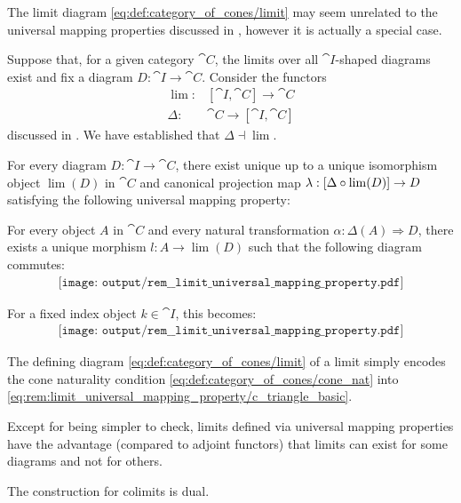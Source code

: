 \begin{remark}\label{rem:limit_universal_mapping_property}
  The limit diagram \eqref{eq:def:category_of_cones/limit} may seem unrelated to the universal mapping properties discussed in , however it is actually a special case.

  Suppose that, for a given category \( \cat{C} \), the limits over all \( \cat{I} \)-shaped diagrams exist and fix a diagram \( D: \cat{I} \to \cat{C} \). Consider the functors
  \begin{align*}
    \lim:   &[\cat{I}, \cat{C}] \to \cat{C} \\
    \Delta: &\cat{C} \to [\cat{I}, \cat{C}]
  \end{align*}
  discussed in . We have established that \( \Delta \dashv \lim \).

  For every diagram \( D: \cat{I} \to \cat{C} \), there exist unique up to a unique isomorphism object \( \lim(D) \) in \( \cat{C} \) and canonical projection map \( \lambda: [\Delta \bincirc {\lim}(D)] \to D \) satisfying the following universal mapping property:
  \begin{displayquote}
    For every object \( A \) in \( \cat{C} \) and every natural transformation \( \alpha: \Delta(A) \Rightarrow D \), there exists a unique morphism \( l: A \to \lim(D) \) such that the following diagram commutes:
    \begin{equation}\label{eq:rem:limit_universal_mapping_property/ic_triangle}
      \begin{aligned}
        \texttt{[image: output/rem\_\_limit\_universal\_mapping\_property.pdf]}
      \end{aligned}
    \end{equation}
  \end{displayquote}

  For a fixed index object \( k \in \cat{I} \), this becomes:
  \begin{equation}\label{eq:rem:limit_universal_mapping_property/c_triangle_basic}
    \begin{aligned}
      \texttt{[image: output/rem\_\_limit\_universal\_mapping\_property.pdf]}
    \end{aligned}
  \end{equation}

  The defining diagram \eqref{eq:def:category_of_cones/limit} of a limit simply encodes the cone naturality condition \eqref{eq:def:category_of_cones/cone_nat} into \eqref{eq:rem:limit_universal_mapping_property/c_triangle_basic}.

  Except for being simpler to check, limits defined via universal mapping properties have the advantage (compared to adjoint functors) that limits can exist for some diagrams and not for others.

  The construction for colimits is dual.
\end{remark}


